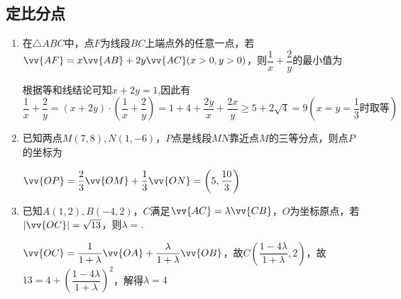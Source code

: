 \subsection*{定比分点}
\begin{enumerate}
    \item 在$\triangle ABC$中，点$F$为线段$BC$上端点外的任意一点，若$\vv{AF} = x \vv{AB} + 2y \vv{AC}(x > 0, y > 0)$，则$\dfrac{1}{x} + \dfrac{2}{y}$的最小值为
    \begin{jieda}
        根据等和线结论可知$x + 2y = 1$,因此有$\dfrac{1}{x} + \dfrac{2}{y} = (x+2y)\cdot\left(\dfrac{1}{x} + \dfrac{2}{y}\right) = 1 + 4 + \dfrac{2y}{x} + \dfrac{2x}{y} \geq 5 + 2\sqrt{4} = 9 \left(x = y = \dfrac{1}{3} \text{时取等}\right)$
    \end{jieda}
    \item 已知两点$M(7,8), N(1, -6)$，$P$点是线段$MN$靠近点$M$的三等分点，则点$P$的坐标为
    \begin{jieda}
        $\vv{OP} = \dfrac{2}{3}\vv{OM} + \dfrac{1}{3} \vv{ON} = \left(5, \dfrac{10}{3}\right)$
    \end{jieda}
    \item 已知$A(1,2), B(-4,2)$，$C$满足$\vv{AC} = \lambda \vv{CB}$，$O$为坐标原点，若$|\vv{OC}| = \sqrt{13}$，则$\lambda = $.
    \begin{jieda}
        $\vv{OC} = \dfrac{1}{1+\lambda} \vv{OA} + \dfrac{\lambda}{1+\lambda} \vv{OB}$，故$C\left(\dfrac{1-4\lambda}{1+\lambda}, 2\right)$，故$13 = 4 + \left(\dfrac{1-4\lambda}{1+\lambda}\right)^2$，解得$\lambda = 4$
    \end{jieda}
\end{enumerate}
